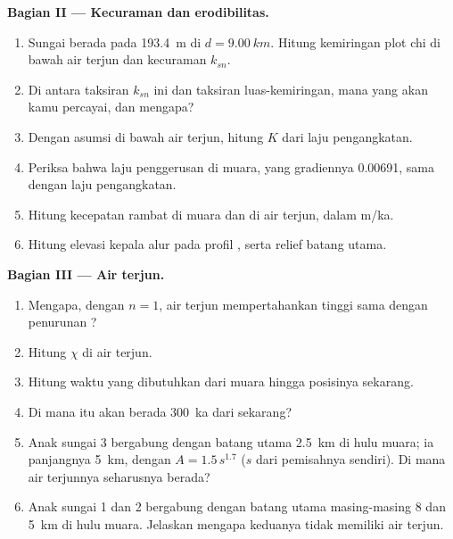 \begin{problem}
\medskip\noindent\textbf{Bagian II --- Kecuraman dan erodibilitas.}
\begin{enumerate}[resume]
\item Sungai berada pada \qty{193.4}{m} di $d = \qty{9.00}{km}$. Hitung
  kemiringan plot chi di bawah air terjun dan kecuraman $k_{sn}$.
\item Di antara taksiran $k_{sn}$ ini dan taksiran luas-kemiringan, mana yang
  akan kamu percayai, dan mengapa?
\item Dengan asumsi  di bawah air terjun, hitung $K$ dari
  laju pengangkatan.
\item Periksa bahwa laju penggerusan di muara, yang gradiennya
  0.00691, sama dengan laju pengangkatan.
\item Hitung kecepatan rambat  di muara dan di
  air terjun, dalam m/ka.
\item Hitung elevasi kepala alur pada profil , serta
  relief batang utama.
\end{enumerate}

\medskip\noindent\textbf{Bagian III --- Air terjun.}
\begin{enumerate}[resume]
\item Mengapa, dengan $n = 1$, air terjun mempertahankan tinggi
  sama dengan penurunan ?
\item Hitung $\chi$ di air terjun.
\item Hitung waktu yang dibutuhkan  dari muara hingga
  posisinya sekarang.
\item Di mana  itu akan berada \qty{300}{ka} dari sekarang?
\item Anak sungai 3 bergabung dengan batang utama \qty{2.5}{km} di hulu muara; ia
  panjangnya \qty{5}{km}, dengan $A = 1.5\,s^{1.7}$ ($s$ dari pemisahnya sendiri).
  Di mana air terjunnya seharusnya berada?
\item Anak sungai 1 dan 2 bergabung dengan batang utama masing-masing 8 dan \qty{5}{km} di hulu
  muara. Jelaskan mengapa keduanya tidak memiliki air terjun.
\end{enumerate}


\end{problem}

